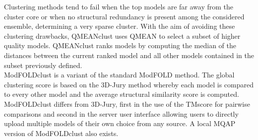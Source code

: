 Clustering methods tend to fail when the top models are far away from the cluster core or when no structural redundancy is present among the considered ensemble, determining a very sparse cluster. 
With the aim of avoiding these clustering drawbacks, QMEANclust \cite{Benkert2008ab, Benkert2008aa} uses QMEAN to select a subset of higher quality models. QMEANclust ranks models by computing the median of the distances between the current ranked model and all other models contained in the subset previously defined.\\
ModFOLDclust \cite{McGuffin2008} is a variant of the standard ModFOLD method. The global clustering score is based on the 3D-Jury \cite{Ginalski2003} method whereby each model is compared to every other model and the average structural similarity score is computed. ModFOLDclust differs from 3D-Jury, first in the use of the TMscore for pairwise comparisons and second in the server user interface allowing users to directly upload multiple models of their own choice from any source. A local MQAP version of ModFOLDclust also exists.


\cleardoublepage
